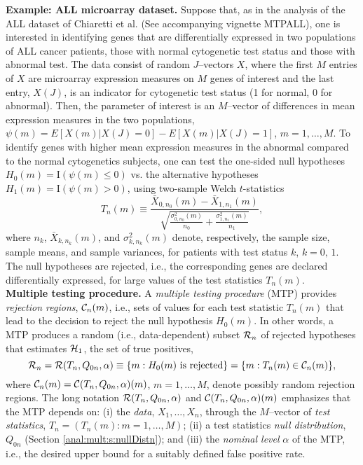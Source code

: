 \documentclass[11pt]{article}
\begin{document}
\noindent
{\bf Example: ALL microarray dataset.}
Suppose that, as in the analysis of the ALL dataset of  Chiaretti et al. \cite{Chiarettietal04} (See accompanying vignette MTPALL), one is interested in identifying genes that are differentially expressed in two populations of  ALL cancer patients, those with normal cytogenetic test status and those with abnormal test. 
The data consist of random $J$--vectors $X$, where the first $M$ entries of $X$ are microarray expression measures on $M$ genes of interest and the last entry, $X(J)$, is an indicator for cytogenetic test status (1 for normal, 0 for abnormal). 
Then, the parameter of interest is an $M$--vector of differences in mean expression measures in the two populations, $\psi(m) = E[X(m) | X(J)=0] - E[X(m) | X(J)=1]$, $m=1,\ldots,M$. 
To identify genes with higher mean expression measures in the abnormal compared to the normal cytogenetics subjects, one can test the one-sided null hypotheses $H_0(m) = \mathrm{I}(\psi(m) \leq 0)$ vs. the alternative hypotheses $H_1(m) = \mathrm{I}(\psi(m) > 0)$, using two-sample Welch $t$-statistics 
\begin{equation}
T_n(m) \equiv \frac{\bar{X}_{0,n_0}(m) - \bar{X}_{1,n_1}(m)}{\sqrt{\frac{\sigma_{0,n_0}^2(m)}{n_0} + \frac{\sigma_{1,n_1}^2(m)}{n_1}}},
\end{equation}
where $n_k$, $\bar{X}_{k,n_k}(m)$, and $\sigma_{k,n_k}^2(m)$ denote, respectively, the sample size, sample means, and sample variances, for patients with test status $k$, $k=0,\, 1$. The null hypotheses are rejected, i.e., the corresponding genes are declared differentially expressed, for large values of the test statistics $T_n(m)$.\\

\noindent
{\bf Multiple testing procedure.} A {\em multiple testing procedure} (MTP) provides {\em rejection regions}, ${\cal C}_n(m)$, i.e., sets of values for each test statistic $T_n(m)$ that lead to the decision to reject the null hypothesis $H_0(m)$. 
In other words, a MTP produces a random (i.e., data-dependent) subset ${\cal R}_n$ of rejected hypotheses that estimates ${\cal H}_1$, the set of true positives,
\begin{equation}
{\cal R}_n={\cal R}(T_n, Q_{0n},\alpha) \equiv 
\{m:\mbox{$H_0(m)$ is rejected}\} = \{m: T_n(m) \in {\cal C}_n(m)\},
\end{equation}
where ${\cal C}_n(m)={\cal C}(T_n,Q_{0n},\alpha)(m)$, $m=1,\ldots,M$, denote possibly random rejection regions. The long notation ${\cal R}(T_n, Q_{0n},\alpha)$ and ${\cal C}(T_n, Q_{0n},\alpha)(m)$ emphasizes that the MTP depends on:
(i) the {\em data}, $X_1, \ldots, X_n$,
 through the $M$--vector of {\em test statistics}, $T_n = (T_n(m): m=1,\ldots,
 M)$;
 (ii) a test statistics {\em null distribution}, $Q_{0n}$ (Section \ref{anal:mult:s:nullDistn}); and 
(iii) the {\em nominal level} $\alpha$ of the MTP, i.e., the desired upper bound for a suitably defined false positive rate. 
\end{document}
